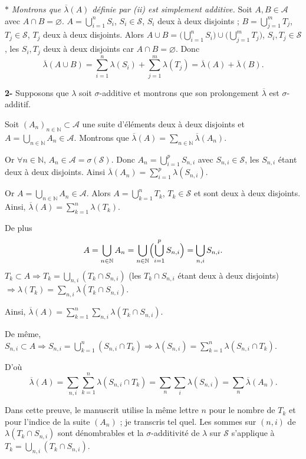 \documentclass[11pt,a4paper]{article}
\newcommand{\N}{\mathbb{N}}
\newcommand{\A}{\mathscr{A}}
\newcommand{\Ss}{\mathscr{S}}
\begin{document}
$\ast$ \emph{Montrons que $\overline\lambda(A)$ définie par (ii) est simplement additive.}
Soit $A,B\in\A$ avec $A\cap B=\varnothing$. $A=\bigcup_{i=1}^{n}S_i$, $S_i\in\Ss$, $S_i$ deux à deux disjoints ;
$B=\bigcup_{j=1}^{m}T_j$, $T_j\in\Ss$, $T_j$ deux à deux disjoints.
Alors $A\cup B=\bigl(\bigcup_{i=1}^{n}S_i\bigr)\cup\bigl(\bigcup_{j=1}^{m}T_j\bigr)$, $S_i,T_j\in\Ss$, les $S_i,T_j$ deux à deux disjoints car $A\cap B=\varnothing$.
Donc
\[
  \overline\lambda(A\cup B)=\sum_{i=1}^{n}\lambda(S_i)+\sum_{j=1}^{m}\lambda(T_j)=\overline\lambda(A)+\overline\lambda(B).
\]

\textbf{2-} Supposons que $\lambda$ soit $\sigma$-additive et montrons que son prolongement $\overline\lambda$ est $\sigma$-additif.

Soit $(A_n)_{n\in\N}\subset\A$ une suite d'éléments deux à deux disjoints et $A=\bigcup_{n\in\N}A_n\in\A$.
Montrons que $\overline\lambda(A)=\sum_{n\in\N}\overline\lambda(A_n)$.

Or $\forall n\in\N$, $A_n\in\A=\sigma(\Ss)$. Donc $A_n=\bigcup_{i=1}^{p}S_{n,i}$ avec $S_{n,i}\in\Ss$, les $S_{n,i}$ étant deux à deux disjoints.
Ainsi $\overline\lambda(A_n)=\sum_{i=1}^{p}\lambda(S_{n,i})$.

Or $A=\bigcup_{n\in\N}A_n\in\A$. Alors $A=\bigcup_{k=1}^{n}T_k$, $T_k\in\Ss$ et sont deux à deux disjoints. Ainsi, $\overline\lambda(A)=\sum_{k=1}^{n}\lambda(T_k)$.

De plus
\[
  A=\bigcup_{n\in\N}A_n=\bigcup_{n\in\N}\Bigl(\bigcup_{i=1}^{p}S_{n,i}\Bigr)=\bigcup_{n,i}S_{n,i}.
\]
$T_k\subset A\Rightarrow T_k=\bigcup_{n,i}(T_k\cap S_{n,i})$ (les $T_k\cap S_{n,i}$ étant deux à deux disjoints)
$\Rightarrow\lambda(T_k)=\sum_{n,i}\lambda(T_k\cap S_{n,i})$.

Ainsi, $\displaystyle\overline\lambda(A)=\sum_{k=1}^{n}\sum_{n,i}\lambda(T_k\cap S_{n,i})$.

De même, $S_{n,i}\subset A\Rightarrow S_{n,i}=\bigcup_{k=1}^{n}(S_{n,i}\cap T_k)\Rightarrow\lambda(S_{n,i})=\sum_{k=1}^{n}\lambda(S_{n,i}\cap T_k)$.

D'où
\[
  \overline\lambda(A)=\sum_{n,i}\sum_{k=1}^{n}\lambda(S_{n,i}\cap T_k)=\sum_{n}\sum_{i}\lambda(S_{n,i})=\sum_{n}\overline\lambda(A_n).
\]

\begin{note}
Dans cette preuve, le manuscrit utilise la même lettre $n$ pour le nombre de $T_k$ et pour l'indice de la suite $(A_n)$ ; je transcris tel quel.
Les sommes sur $(n,i)$ de $\lambda(T_k\cap S_{n,i})$ sont dénombrables et la $\sigma$-additivité de $\lambda$ sur $\Ss$ s'applique à $T_k=\bigcup_{n,i}(T_k\cap S_{n,i})$.
\end{note}
\end{document}
